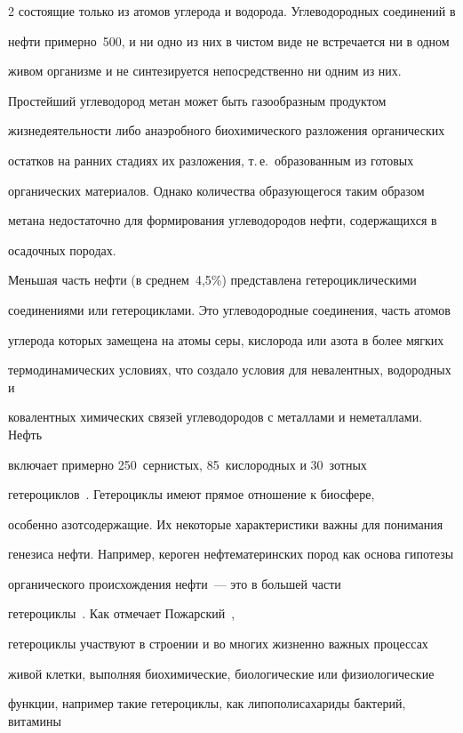 \begin{multicols}{2}
состоящие только из атомов углерода и водорода. Углеводородных соединений в 

нефти примерно~500, и ни одно из них в чистом виде не встречается ни в одном 

живом организме и не синтезируется непосредственно ни одним из них. 

Простейший углеводород метан может быть газообразным продуктом 

жизнедеятельности либо анаэробного биохимического разложения органических 

остатков на ранних стадиях их разложения, т.\,е.\ образованным из готовых 

органических материалов. Однако количества образующегося таким образом 

метана недостаточно для формирования углеводородов нефти, содержащихся в 

осадочных породах.

     

     Меньшая часть нефти (в среднем~4,5\%) пред\-став\-ле\-на гетероциклическими 

соединениями или гетероциклами. Это углеводородные соединения, часть атомов 

углерода которых замещена на атомы серы, кислорода или азота в более мягких 

термодинамических условиях, что создало условия для невалентных, водородных и 

ковалентных химических связей углеводородов с металлами и неметаллами. Нефть 

включает примерно 250~сернистых, 85~кис\-ло\-род\-ных и 30~зотных 

гетероциклов~\cite{16s}. Ге\-те\-ро\-цик\-лы имеют прямое отношение к биосфере, 

особенно азотсодержащие. Их некоторые характеристики важны для понимания 

генезиса нефти. Например, кероген нефтематеринских пород как основа гипотезы 

органического происхождения нефти~--- это в большей части 

гетероциклы~\cite{34s, 4s}. Как отмечает Пожарский~\cite{18s}, 

гетероциклы участвуют в строении и во многих жизненно важных процессах 

живой клетки, выполняя биохимические, биологические или физиологические 

функции, например такие гетероциклы, как липополисахариды бактерий, витамины 


\end{multicols}
